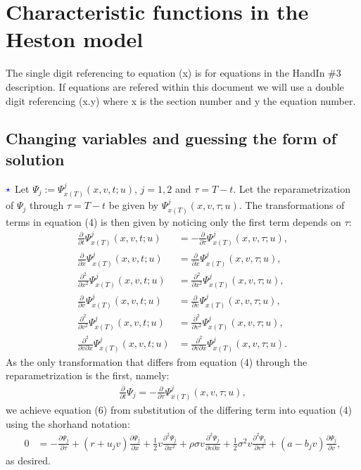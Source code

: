 \documentclass[11pt]{article}
\numberwithin{equation}{section}
\begin{document}
\newpage
\section{Characteristic functions in the Heston model}
The single digit referencing to equation (x) is for equations in the HandIn \#3
description. If equations are refered within this document we will use a double
digit referencing (x.y) where x is the section number and y the equation number. 
\subsection{Changing variables and guessing the form of solution}
$\textcolor{blue}{\star}$ Let $\Psi_j:=\Psi_{x(T)}^j(x,v,t;u)$, $j=1,2$ and $\tau=T-t$. Let the
reparametrization of $\Psi_j$ through $\tau=T-t$ be given by
$\Psi_{x(T)}^j(x,v,\tau;u)$. The transformations of terms in equation (4) is then given
by noticing only the first term depends on $\tau$:
\begin{align*}
    \frac{\partial }{\partial t}\Psi_{x(T)}^j(x,v,t;u)&=-\frac{\partial }{\partial \tau}\Psi_{x(T)}^j(x,v,\tau;u),\\
    \frac{\partial }{\partial x}\Psi_{x(T)}^j(x,v,t;u)&=\frac{\partial }{\partial x}\Psi_{x(T)}^j(x,v,\tau;u),\\
    \frac{\partial^2 }{\partial x^2}\Psi_{x(T)}^j(x,v,t;u)&=\frac{\partial ^2}{\partial x^2}\Psi_{x(T)}^j(x,v,\tau;u),\\
    \frac{\partial }{\partial v}\Psi_{x(T)}^j(x,v,t;u)&=\frac{\partial }{\partial v}\Psi_{x(T)}^j(x,v,\tau;u),\\
    \frac{\partial^2 }{\partial v^2}\Psi_{x(T)}^j(x,v,t;u)&=\frac{\partial^2 }{\partial v^2}\Psi_{x(T)}^j(x,v,\tau;u),\\
    \frac{\partial^2 }{\partial v \partial x}\Psi_{x(T)}^j(x,v,t;u)&=\frac{\partial^2 }{\partial v \partial x}\Psi_{x(T)}^j(x,v,\tau;u).
\end{align*}
As the only transformation that differs from equation (4) through the
reparametrization is the first, namely:
\begin{align*}
    \frac{\partial }{\partial t}\Psi_j=-\frac{\partial }{\partial
\tau}\Psi_{x(T)}^j(x,v,\tau;u),
\end{align*}
we achieve equation (6) from substitution of the
differing term into equation (4) using the shorhand notation:
\begin{align*}
    0&=-\frac{\partial \Psi_j}{\partial \tau}+(r+u_jv)\frac{\partial \Psi_j}{\partial x}+
    \frac{1}{2}v\frac{\partial^2 \Psi_j}{\partial x^2}+\rho\sigma v \frac{\partial^2 \Psi_j}{\partial v \partial x}+
    \frac{1}{2}\sigma^2v \frac{\partial^2 \Psi_j}{\partial v^2}+(a-b_j v) \frac{\partial \Psi_j}{\partial v},
\end{align*}
as desired.
\end{document}
